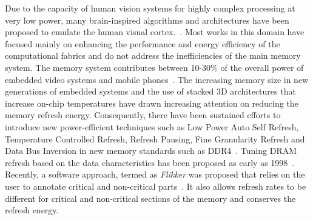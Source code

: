 
Due to the capacity of human vision systems for highly complex processing at very low power, many brain-inspired algorithms and architectures have been proposed to emulate the human visual cortex.~\cite{Nere2011,Chen2014,Kestur2012}. %
Most works in this domain have focused mainly on enhancing the performance and energy efficiency of the computational fabrics and do not address the inefficiencies of the main memory system. The memory system contributes between 10-30\% of the overall power of embedded video systems and mobile phones~\cite{CarrollAaronHeiser2010}. The increasing memory size in new generations of embedded systems and the use of stacked 3D architectures that increase on-chip temperatures have drawn increasing attention on reducing the memory refresh energy. Consequently, there have been sustained efforts to introduce new power-efficient techniques such as Low Power Auto Self Refresh, Temperature Controlled Refresh, Refresh Pausing, Fine Granularity Refresh and Data Bus Inversion in new memory standards such as DDR4~\cite{jedec-sdram-standards}.  
Tuning DRAM refresh based on the data characteristics has been proposed as early as 1998~\cite{islped98}. Recently, a software approach, termed as \emph{Flikker} was proposed that relies on the user to annotate critical and non-critical parts~\cite{Liu2011}. It also allows refresh rates to be different for critical and non-critical sections of the memory and conserves the refresh energy. 

